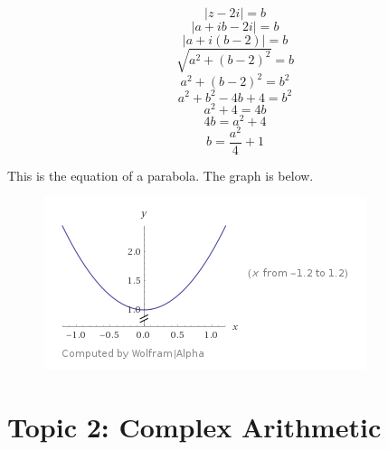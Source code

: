 \documentclass[12pt]{article}
\begin{document}
\begin{equation}
	|z-2i|=b
\end{equation}
\begin{equation}
	|a+ib-2i|=b
\end{equation}
\begin{equation}
	|a+i(b-2)|=b
\end{equation}
\begin{equation}
	\sqrt{a^2+(b-2)^2}=b
\end{equation}
\begin{equation}
	a^2+(b-2)^2=b^2
\end{equation}
\begin{equation}
	a^2+b^2-4b+4=b^2
\end{equation}
\begin{equation}
	a^2+4=4b
\end{equation}
\begin{equation}
	4b=a^2+4
\end{equation}
\begin{equation}
	b=\frac{a^2}{4}+1
\end{equation}

This is the equation of a parabola.  The graph is below.
\begin{figure}[H]
    \includegraphics{Topic1Graph.png}
\end{figure}

\section{Topic 2: Complex Arithmetic}
\end{document}
